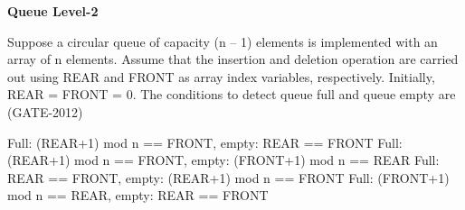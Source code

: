
\centerline{\textbf{ \LARGE Queue Level-2}}

\begin{questyle}
  \question  Suppose a circular queue of capacity (n – 1) elements is implemented with an array of n elements.
            Assume that the insertion and deletion operation are carried out using REAR and FRONT as array index variables, respectively. Initially, REAR = FRONT = 0. The conditions to detect queue full and queue empty are  (GATE-2012)

  \begin{choices}
    \CorrectChoice  Full: (REAR+1) mod n == FRONT, empty: REAR == FRONT
    \choice         Full: (REAR+1) mod n == FRONT, empty: (FRONT+1) mod n == REAR
    \choice         Full: REAR == FRONT, empty: (REAR+1) mod n == FRONT
    \choice         Full: (FRONT+1) mod n == REAR, empty: REAR == FRONT
  \end{choices}
\end{questyle}

